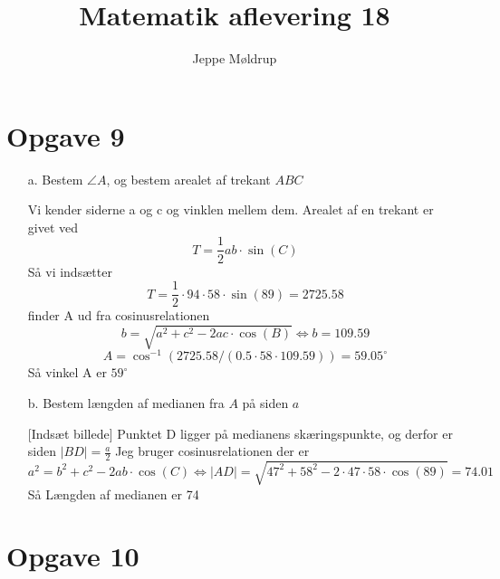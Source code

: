 \documentclass[12pt]{article}
\title{Matematik aflevering 18}
\author{Jeppe Møldrup}
\date{}
\begin{document}
\maketitle

\section*{Opgave 9}

\begin{enumerate}

        \item[a.] Bestem $\angle A$, og bestem arealet af trekant $ABC$

                Vi kender siderne a og c og vinklen mellem dem.
                Arealet af en trekant er givet ved
                $$T=\frac{1}{2}ab\cdot \sin (C)$$
                Så vi indsætter
                $$T=\frac{1}{2} \cdot 94\cdot 58\cdot \sin (89)=2725.58$$
                finder A ud fra cosinusrelationen
                $$b = \sqrt{a^2 + c^2 - 2ac\cdot \cos (B) } \Leftrightarrow b=109.59$$
                $$A = \cos ^{-1} (2725.58/(0.5\cdot 58\cdot 109.59)) = 59.05^{\circ}$$
                Så vinkel A er $59^{\circ}$

        \item[b.] Bestem længden af medianen fra $A$ på siden $a$

                [Indsæt billede]
                Punktet D ligger på medianens skæringspunkte, og derfor er siden $|BD|=\frac{a}{2}$
                Jeg bruger cosinusrelationen der er
                $$a^2=b^2+c^2-2ab\cdot \cos (C) \Leftrightarrow |AD|=\sqrt{47^2+58^2-2\cdot 47\cdot 58\cdot \cos (89)}=74.01$$
                Så Længden af medianen er 74

\end{enumerate}

\section*{Opgave 10}
\end{document}
